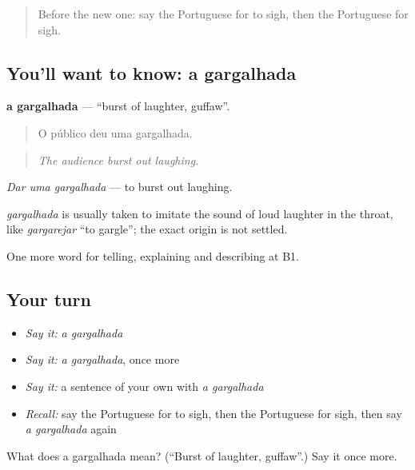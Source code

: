 \label{lesson:PT-C477-gargalhada}



\begin{quote}
Before the new one: say the Portuguese for to sigh, then the Portuguese for sigh.
\end{quote}

\subsection*{You'll want to know: a gargalhada}
\textbf{a gargalhada} — \textquotedblleft{}burst of laughter, guffaw\textquotedblright{}.

\begin{quote}
O público deu uma gargalhada.
\end{quote}

\begin{quote}
\emph{The audience burst out laughing.}
\end{quote}

\emph{Dar uma gargalhada} — to burst out laughing.

\begin{cousinweb}
\emph{gargalhada} is usually taken to imitate the sound of loud laughter in the throat, like \emph{gargarejar} \textquotedblleft{}to gargle\textquotedblright{}; the exact origin is not settled.
\end{cousinweb}

\begin{grammarlens}[title={What you've built}]
One more word for telling, explaining and describing at B1.
\end{grammarlens}

\subsection*{Your turn}
\begin{itemize}
\raggedright
  \item \emph{Say it:} \emph{a gargalhada}
  \item \emph{Say it:} \emph{a gargalhada}, once more
  \item \emph{Say it:} a sentence of your own with \emph{a gargalhada}
  \item \emph{Recall:} say the Portuguese for to sigh, then the Portuguese for sigh, then say \emph{a gargalhada} again
\end{itemize}

\begin{tcolorbox}[breakable,colback=teal!4,colframe=teal!35!black,title={Before you move on}]
What does a gargalhada mean? (\textquotedblleft{}Burst of laughter, guffaw\textquotedblright{}.) Say it once more.
\end{tcolorbox}
